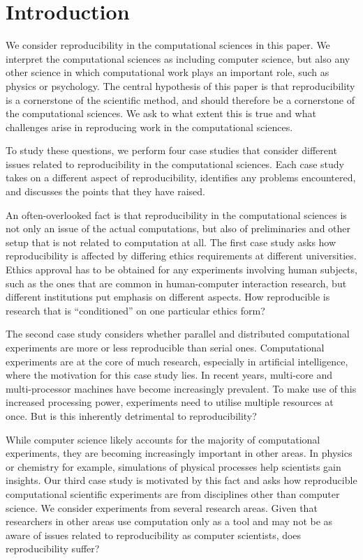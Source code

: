 \section{Introduction}
\label{s:intro}


We consider reproducibility in the computational sciences in this paper.  We
interpret the computational sciences as including computer science, but also any
other science in which computational work plays an important role, such as
physics or psychology. The central hypothesis of this paper is that
reproducibility is a cornerstone of the scientific method, and should therefore
be a cornerstone of the computational sciences. We ask to what extent this is true
and what challenges arise in reproducing work in the computational sciences.

To study these questions, we perform four case studies that consider different
issues related to reproducibility in the computational sciences.  Each case study
takes on a different aspect of reproducibility, identifies any problems
encountered, and discusses the points that they have raised.

An often-overlooked fact is that reproducibility in the computational sciences
is not only an issue of the actual computations, but also of preliminaries and
other setup that is not related to computation at all. The first case study asks
how reproducibility is affected by differing ethics requirements at different
universities. Ethics approval has to be obtained for any experiments involving
human subjects, such as the ones that are common in human-computer interaction
research, but different institutions put emphasis on different aspects. How
reproducible is research that is ``conditioned'' on one particular ethics form?

The second case study considers whether parallel and distributed computational
experiments are more or less reproducible than serial ones. Computational
experiments are at the core of much research, especially in artificial
intelligence, where the motivation for this case study lies. In recent years,
multi-core and multi-processor machines have become increasingly prevalent. To
make use of this increased processing power, experiments need to utilise
multiple resources at once. But is this inherently detrimental to
reproducibility?

While computer science likely accounts for the majority of computational
experiments, they are becoming increasingly important in other areas. In physics
or chemistry for example, simulations of physical processes help scientists gain
insights. Our third case study is motivated by this fact and asks how
reproducible computational scientific experiments are from disciplines other than
computer science. We consider experiments from several research areas. Given
that researchers in other areas use computation only as a tool and may not be
as aware of issues related to reproducibility as computer scientists, does
reproducibility suffer?

